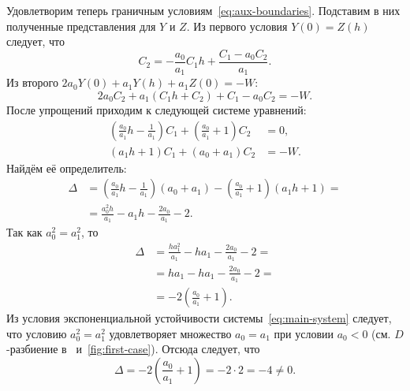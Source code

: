 \documentclass[a4paper,14pt]{article}
\theoremstyle{definition}
\begin{document}
Удовлетворим теперь граничным условиям~\eqref{eq:aux-boundaries}.
Подставим в них полученные представления для $Y$ и $Z$. Из
первого условия $Y(0) = Z(h)$ следует, что
\begin{equation*}
  C_2 =
  - \frac{a_0}{a_1} C_1 h
  + \frac{C_1 - a_0 C_2}{a_1}.
\end{equation*}
Из второго $2 a_0 Y(0) + a_1 Y(h) + a_1 Z(0) = -W$:
\begin{equation*}
  2 a_0 C_2 + a_1 (C_1 h + C_2) + C_1 - a_0 C_2 = -W.
\end{equation*}
После упрощений приходим к следующей системе уравнений:
\begin{equation*}
  \begin{aligned}
    \left(
    \frac{a_0}{a_1} h - \frac{1}{a_1}
    \right) C_1
    + \left(
    \frac{a_0}{a_1} + 1
    \right) C_2 &= 0, \\
    (a_1 h + 1) C_1 + (a_0 + a_1) C_2 &= -W.
  \end{aligned}
\end{equation*}
Найдём её определитель:
\begin{equation*}
  \begin{aligned}
    \Delta
    &=
      \left(
      \frac{a_0}{a_1} h - \frac{1}{a_1}
      \right)
      (a_0 + a_1)
      -
      \left(
      \frac{a_0}{a_1} + 1
      \right)
      (a_1 h + 1) = \\
    &=
      \frac{a_0^2 h}{a_1} - a_1 h
      - \frac{2 a_0}{a_1} - 2.
  \end{aligned}
\end{equation*}
Так как $a_0^2 = a_1^2$, то
\begin{equation*}
  \begin{aligned}
    \Delta
    &=
      \frac{h a_1^2}{a_1} - h a_1
      - \frac{2 a_0}{a_1} - 2 = \\
    &=
      h a_1 - h a_1 - \frac{2 a_0}{a_1} - 2 = \\
    &=
      - 2 \left(
      \frac{a_0}{a_1} + 1
      \right).
  \end{aligned}
\end{equation*}
Из условия экспоненциальной устойчивости системы~\eqref{eq:main-system} следует,
что условию $a_0^2 = a_1^2$ удовлетворяет множество $a_0 = a_1$ при условии
$a_0 < 0$ (см. $D$-разбиение в~\cite[стр.~126]{elsgolc1971}
и~\autoref{fig:first-case}). Отсюда следует, что
\begin{equation*}
  \Delta
  =
  - 2 \left(
    \frac{a_0}{a_1} + 1
  \right)
  =
  -2 \cdot 2 = -4 \neq 0.
\end{equation*}
\end{document}
